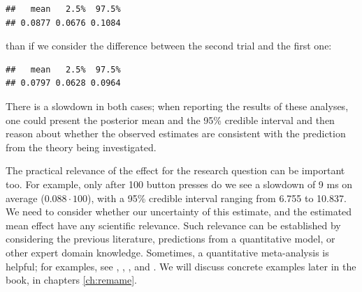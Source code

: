 \documentclass[12pt,]{krantz}
\newenvironment{Shaded}{\begin{snugshade}}{\end{snugshade}}
\newcommand{\KeywordTok}[1]{\textcolor[rgb]{0.13,0.29,0.53}{\textbf{#1}}}
\newcommand{\DataTypeTok}[1]{\textcolor[rgb]{0.13,0.29,0.53}{#1}}
\newcommand{\DecValTok}[1]{\textcolor[rgb]{0.00,0.00,0.81}{#1}}
\newcommand{\StringTok}[1]{\textcolor[rgb]{0.31,0.60,0.02}{#1}}
\newcommand{\OperatorTok}[1]{\textcolor[rgb]{0.81,0.36,0.00}{\textbf{#1}}}
\newcommand{\NormalTok}[1]{#1}
\theoremstyle{definition}
\theoremstyle{definition}
\theoremstyle{definition}
\theoremstyle{remark}
\begin{document}
\begin{verbatim}
##   mean   2.5%  97.5% 
## 0.0877 0.0676 0.1084
\end{verbatim}

than if we consider the difference between the second trial and the
first one:

\begin{Shaded}
\end{Shaded}

\begin{verbatim}
##   mean   2.5%  97.5% 
## 0.0797 0.0628 0.0964
\end{verbatim}

There is a slowdown in both cases; when reporting the results of these
analyses, one could present the posterior mean and the 95\% credible
interval and then reason about whether the observed estimates are
consistent with the prediction from the theory being investigated.

The practical relevance of the effect for the research question can be
important too. For example, only after 100 button presses do we see a
slowdown of 9 ms on average (\(0.088 \cdot 100\)), with a 95\% credible
interval ranging from 6.755 to 10.837. We need to consider whether our
uncertainty of this estimate, and the estimated mean effect have any
scientific relevance. Such relevance can be established by considering
the previous literature, predictions from a quantitative model, or other
expert domain knowledge. Sometimes, a quantitative meta-analysis is
helpful; for examples, see \citet{JaegerEngelmannVasishth2017},
\citet{mahowald2016meta}, \citet{NicenboimRoettgeretal}, and
\citet{vasishthProcessingChineseRelative2013}. We will discuss concrete
examples later in the book, in chapters \ref{ch:remame}.
\end{document}
